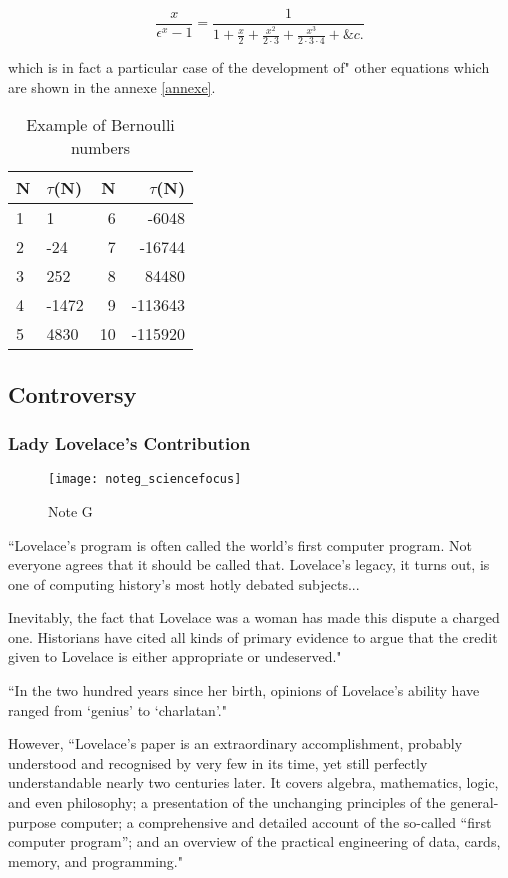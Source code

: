 \documentclass[a4paper, 12pt]{article}
\begin{document}
$$ \frac{x}{\epsilon^x - 1} = \frac{1}{1 + \frac{x}{2} + \frac{x^2}{2 \cdot 3}+\frac{x^3}{2 \cdot 3 \cdot 4} + \& c.} $$

\noindent which is in fact a particular case of the development of" other equations which are shown in the annexe \ref{annexe}. \cite{ada}

\begin{table}[h]
\centering
\begin{tabular}{ll|rr}
\hline
N & $\tau$(N) & N & $\tau$(N)\\
\hline
1 & 1 & 6 & -6048 \\
2 & -24 & 7 & -16744 \\
3 & 252 & 8 & 84480 \\
4 & -1472 & 9 & -113643 \\
5 & 4830 & 10 & -115920 \\
\hline
\end{tabular}
\caption{Example of Bernoulli numbers \cite{bernoulli}}
\label{bern}
\end{table}

\subsection{Controversy}

\subsubsection{Lady Lovelace's Contribution}

\begin{figure}[h]
\texttt{[image: noteg\_sciencefocus]}
\caption{Note G}
\end{figure}

``Lovelace’s program is often called the world’s first computer program. Not everyone agrees that it should be called that. Lovelace’s legacy, it turns out, is one of computing history’s most hotly debated subjects... 

Inevitably, the fact that Lovelace was a woman has made this dispute a charged one. Historians have cited all kinds of primary evidence to argue that the credit given to Lovelace is either appropriate or undeserved." \cite{twobit} 

``In the two hundred years since her birth, opinions of Lovelace's ability have ranged from ‘genius’ to ‘charlatan’." \cite{earlymath}

However, ``Lovelace’s paper is an extraordinary accomplishment, probably understood and recognised by very few in its time, yet still perfectly understandable nearly two centuries later. It covers algebra, mathematics, logic, and even philosophy; a presentation of the unchanging principles of the general-purpose computer; a comprehensive and detailed account of the so-called “first computer program”; and an overview of the practical engineering of data, cards, memory, and programming." \cite{bodleian}
\end{document}
